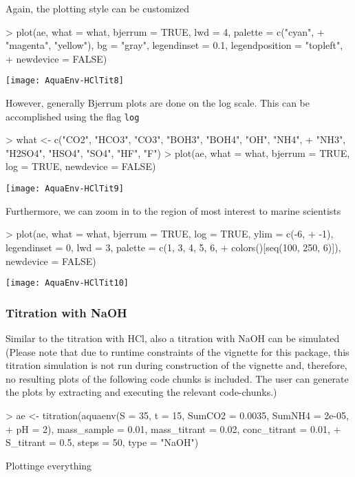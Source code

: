 \documentclass[article,nojss]{jss}
\begin{document}
Again, the plotting style can be customized
\begin{Schunk}
\begin{Sinput}
> plot(ae, what = what, bjerrum = TRUE, lwd = 4, palette = c("cyan", 
+     "magenta", "yellow"), bg = "gray", legendinset = 0.1, legendposition = "topleft", 
+     newdevice = FALSE)
\end{Sinput}
\end{Schunk}
\texttt{[image: AquaEnv-HClTit8]}

However, generally Bjerrum plots are done on the log scale. This can be accomplished using the flag \texttt{log}
\begin{Schunk}
\begin{Sinput}
> what <- c("CO2", "HCO3", "CO3", "BOH3", "BOH4", "OH", "NH4", 
+     "NH3", "H2SO4", "HSO4", "SO4", "HF", "F")
> plot(ae, what = what, bjerrum = TRUE, log = TRUE, newdevice = FALSE)
\end{Sinput}
\end{Schunk}
\texttt{[image: AquaEnv-HClTit9]}

Furthermore, we can zoom in to the region of most interest to marine scientists
\begin{Schunk}
\begin{Sinput}
> plot(ae, what = what, bjerrum = TRUE, log = TRUE, ylim = c(-6, 
+     -1), legendinset = 0, lwd = 3, palette = c(1, 3, 4, 5, 6, 
+     colors()[seq(100, 250, 6)]), newdevice = FALSE)
\end{Sinput}
\end{Schunk}
\texttt{[image: AquaEnv-HClTit10]}




\subsubsection{Titration with NaOH}

Similar to the titration with HCl, also a titration with NaOH can be simulated
(Please note that due to runtime constraints of the vignette for this package, this titration simulation is not run during construction of the vignette 
and, therefore, no resulting plots of the following code chunks is included. The user can generate the plots by extracting and executing the relevant code-chunks.)

\begin{Schunk}
\begin{Sinput}
> ae <- titration(aquaenv(S = 35, t = 15, SumCO2 = 0.0035, SumNH4 = 2e-05, 
+     pH = 2), mass_sample = 0.01, mass_titrant = 0.02, conc_titrant = 0.01, 
+     S_titrant = 0.5, steps = 50, type = "NaOH")
\end{Sinput}
\end{Schunk}
Plottinge everything
\begin{Schunk}
\end{Schunk}
\end{document}
